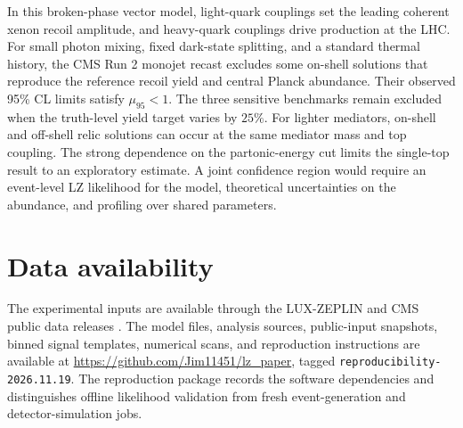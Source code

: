 \documentclass[aps,prd,reprint,superscriptaddress,longbibliography,floatfix]{revtex4-2}
\begin{document}
In this broken-phase vector model, light-quark couplings set the leading coherent xenon recoil amplitude, and heavy-quark couplings drive production at the LHC. For small photon mixing, fixed dark-state splitting, and a standard thermal history, the CMS Run 2 monojet recast excludes some on-shell solutions that reproduce the reference recoil yield and central Planck abundance. Their observed 95\% CL limits satisfy $\mu_{95}<1$. The three sensitive benchmarks remain excluded when the truth-level yield target varies by $25\%$. For lighter mediators, on-shell and off-shell relic solutions can occur at the same mediator mass and top coupling. The strong dependence on the partonic-energy cut limits the single-top result to an exploratory estimate. A joint confidence region would require an event-level LZ likelihood for the model, theoretical uncertainties on the abundance, and profiling over shared parameters.



\section*{Data availability}
The experimental inputs are available through the LUX-ZEPLIN and CMS public
data releases \cite{lzdata,cmscovariance,cmsyields,cmssignal,cmscutflow}.
The model files, analysis sources, public-input snapshots, binned signal
templates, numerical scans, and reproduction instructions are available at
\url{https://github.com/Jim11451/lz_paper}, tagged
\texttt{reproducibility-2026.11.19}. The reproduction package records the
software dependencies and distinguishes offline likelihood validation from
fresh event-generation and detector-simulation jobs.

\clearpage
\onecolumngrid


\clearpage
\twocolumngrid

\end{document}

